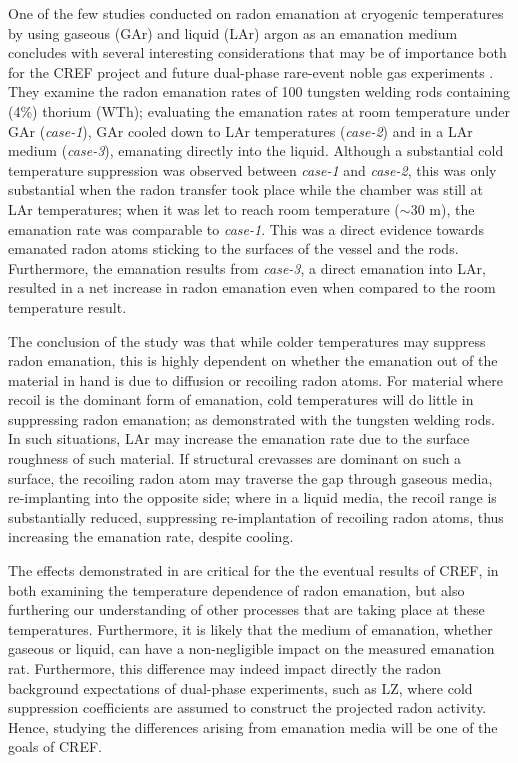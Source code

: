 One of the few studies conducted on radon emanation at cryogenic temperatures by using gaseous (GAr) and liquid (LAr) argon as an emanation medium concludes with several interesting considerations that may be of importance both for the CREF project and future dual-phase rare-event noble gas experiments \cite{cold_radon_measurements}. They examine the radon emanation rates of 100 tungsten welding rods containing (4\%) thorium (WTh); evaluating the emanation rates at room temperature under GAr (\textit{case-1}), GAr cooled down to LAr temperatures (\textit{case-2}) and in a LAr medium (\textit{case-3}), emanating directly into the liquid. Although a substantial cold temperature suppression was observed between \textit{case-1} and \textit{case-2}, this was only substantial when the radon transfer took place while the chamber was still at LAr temperatures; when it was let to reach room temperature ($\sim30$ m), the emanation rate was comparable to \textit{case-1}. This was a direct evidence towards emanated radon atoms sticking to the surfaces of the vessel and the rods. Furthermore, the emanation results from \textit{case-3}, a direct emanation into LAr, resulted in a net increase in radon emanation even when compared to the room temperature result. 

The conclusion of the study was that while colder temperatures may suppress radon emanation, this is highly dependent on whether the emanation out of the material in hand is due to diffusion or recoiling radon atoms. For material where recoil is the dominant form of emanation, cold temperatures will do little in suppressing radon emanation; as demonstrated with the tungsten welding rods. In such situations, LAr may increase the emanation rate due to the surface roughness of such material. If structural crevasses are dominant on such a surface, the recoiling radon atom may traverse the gap through gaseous media, re-implanting into the opposite side; where in a liquid media, the recoil range is substantially reduced, suppressing re-implantation of recoiling radon atoms, thus increasing the emanation rate, despite cooling. 

The effects demonstrated in \cite{cold_radon_measurements} are critical for the the eventual results of CREF, in both examining the temperature dependence of radon emanation, but also furthering our understanding of other processes that are taking place at these temperatures. Furthermore, it is likely that the medium of emanation, whether gaseous or liquid, can have a non-negligible impact on the measured emanation rat. Furthermore, this difference may indeed impact directly the radon background expectations of dual-phase experiments, such as LZ, where cold suppression coefficients are assumed to construct the projected radon activity. Hence, studying the differences arising from emanation media will be one of the goals of CREF.  